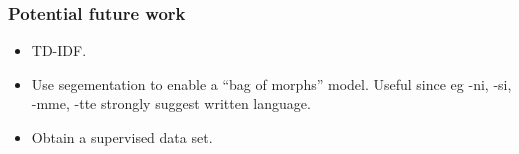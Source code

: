 \documentclass{beamer}
\begin{document}
\begin{frame}
  \frametitle{Potential future work}
  \begin{itemize}
    \item TD-IDF.\pause{}

    \item Use segementation to enable a ``bag of morphs'' model. Useful
      since eg -ni, -si, -mme, -tte strongly suggest written language.\pause{}

    \item Obtain a supervised data set.
  \end{itemize}
\end{frame}
\end{document}
